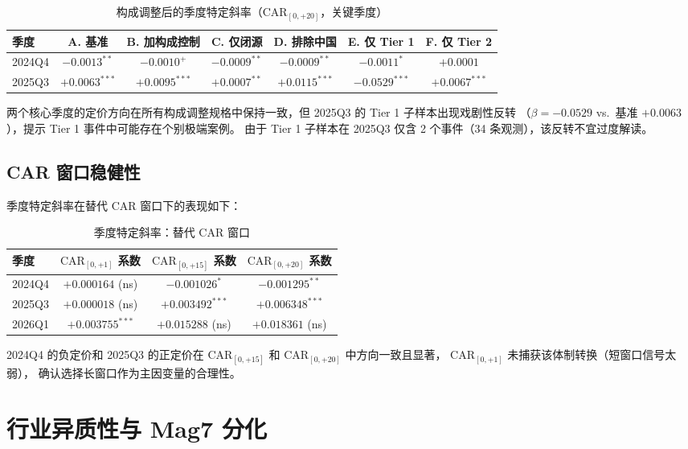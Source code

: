 \documentclass[11pt,fontset=fandol,a4paper]{ctexart}
\begin{document}
\begin{table}[htbp]
\centering
\caption{构成调整后的季度特定斜率（$\text{CAR}_{[0,+20]}$，关键季度）}
\label{tab:comp_adj}
\small
\begin{tabular}{lcccccc}
\toprule
季度 & A. 基准 & B. 加构成控制 & C. 仅闭源 & D. 排除中国 & E. 仅 Tier 1 & F. 仅 Tier 2 \\
\midrule
2024Q4 & $-0.0013^{**}$ & $-0.0010^{+}$ & $-0.0009^{**}$ & $-0.0009^{**}$ & $-0.0011^{*}$ & $+0.0001$ \\
2025Q3 & $+0.0063^{***}$ & $+0.0095^{***}$ & $+0.0007^{**}$ & $+0.0115^{***}$ & $-0.0529^{***}$ & $+0.0067^{***}$ \\
\bottomrule
\end{tabular}
\end{table}

两个核心季度的定价方向在所有构成调整规格中保持一致，但 2025Q3 的 Tier 1 子样本出现戏剧性反转
（$\beta=-0.0529$ vs.\ 基准 $+0.0063$），提示 Tier 1 事件中可能存在个别极端案例。
由于 Tier 1 子样本在 2025Q3 仅含 2 个事件（34 条观测），该反转不宜过度解读。

\subsection{CAR 窗口稳健性}

季度特定斜率在替代 CAR 窗口下的表现如下：

\begin{table}[htbp]
\centering
\caption{季度特定斜率：替代 CAR 窗口}
\label{tab:quarter_robust}
\small
\begin{tabular}{lccc}
\toprule
季度 & $\text{CAR}_{[0,+1]}$ 系数 & $\text{CAR}_{[0,+15]}$ 系数 & $\text{CAR}_{[0,+20]}$ 系数 \\
\midrule
2024Q4 & $+0.000164$ (ns) & $-0.001026^{*}$ & $-0.001295^{**}$ \\
2025Q3 & $+0.000018$ (ns) & $+0.003492^{***}$ & $+0.006348^{***}$ \\
2026Q1 & $+0.003755^{***}$ & $+0.015288$ (ns) & $+0.018361$ (ns) \\
\bottomrule
\end{tabular}
\end{table}

2024Q4 的负定价和 2025Q3 的正定价在 $\text{CAR}_{[0,+15]}$ 和 $\text{CAR}_{[0,+20]}$ 中方向一致且显著，
$\text{CAR}_{[0,+1]}$ 未捕获该体制转换（短窗口信号太弱），
确认选择长窗口作为主因变量的合理性。

\section{行业异质性与 Mag7 分化}
\end{document}
